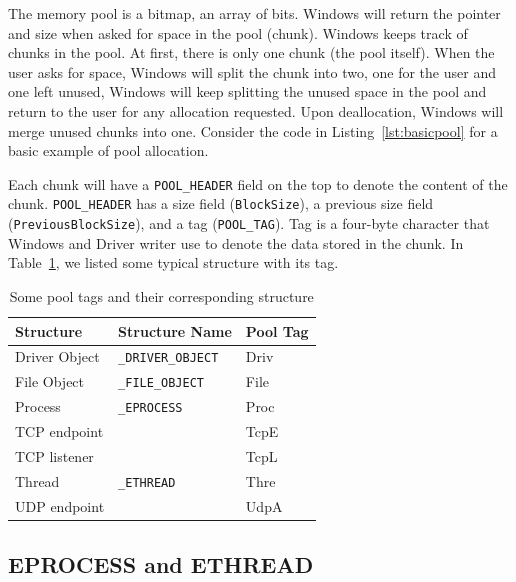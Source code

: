 The memory pool is a bitmap, an array of bits. Windows will return the pointer and size when asked for space in the pool (chunk). Windows keeps track of chunks in the pool. At first, there is only one chunk (the pool itself). When the user asks for space, Windows will split the chunk into two, one for the user and one left unused, Windows will keep splitting the unused space in the pool and return to the user for any allocation requested. Upon deallocation, Windows will merge unused chunks into one. Consider the code in Listing~\ref{lst:basicpool} for a basic example of pool allocation.


Each chunk will have a \texttt{POOL\_HEADER} field on the top to denote the content of the chunk. \texttt{POOL\_HEADER} has a size field (\texttt{BlockSize}), a previous size field (\texttt{PreviousBlockSize}), and a tag (\texttt{POOL\_TAG}). Tag is a four-byte character that Windows and Driver writer use to denote the data stored in the chunk. In Table~\ref{tab:pooltag}, we listed some typical structure with its tag.
\newpage


\begin{table}[h]
\centering
\caption{Some pool tags and their corresponding structure}
\label{tab:pooltag}
\begin{tabular}{lll}
\toprule
\textbf{Structure}     & \textbf{Structure Name}   & \textbf{Pool Tag} \\ \hline
Driver Object & \texttt{\_DRIVER\_OBJECT} & Driv     \\
File Object   & \texttt{\_FILE\_OBJECT}   & File     \\
Process       & \texttt{\_EPROCESS}       & Proc     \\
TCP endpoint  &                  & TcpE     \\
TCP listener  &                  & TcpL     \\
Thread        & \texttt{\_ETHREAD}        & Thre     \\
UDP endpoint  &                  & UdpA     \\
\bottomrule
\end{tabular}
\end{table}

\subsection[EPROCESS and ETHREAD]{EPROCESS and ETHREAD}

